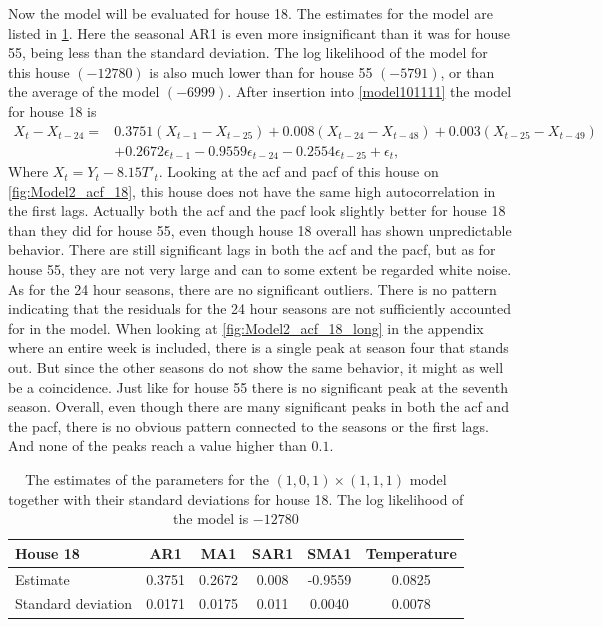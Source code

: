\noindent Now the model will be evaluated for house 18. The estimates for the model are listed in \cref{tab:ParamSig_House18}. Here the seasonal AR1 is even more insignificant than it was for house 55, being less than the standard deviation. The log likelihood of the model for this house $(-12780)$ is also much lower than for house 55 $(-5791)$, or than the average of the model $(-6999)$. After insertion into \cref{model101111} the model for house 18 is
\begin{align}
    X_t-X_{t-24} = &0.3751 (X_{t-1}-X_{t-25}) + 0.008 (X_{t-24}-X_{t-48}) + 0.003 (X_{t-25}-X_{t-49}) \nonumber\\  &+ 0.2672 \epsilon_{t-1} - 0.9559 \epsilon_{t-24} - 0.2554 \epsilon_{t-25} + \epsilon_t,
\end{align}
Where $X_t = Y_t - 8.15 T'_t$. Looking at the acf and pacf of this house on \cref{fig:Model2_acf_18}, this house does not have the same high autocorrelation in the first lags. Actually both the acf and the pacf look slightly better for house 18 than they did for house 55, even though house 18 overall has shown unpredictable behavior. There are still significant lags in both the acf and the pacf, but as for house 55, they are not very large and can to some extent be regarded white noise. As for the 24 hour seasons, there are no significant outliers. There is no pattern indicating that the residuals for the 24 hour seasons are not sufficiently accounted for in the model. When looking at \cref{fig:Model2_acf_18_long} in the appendix where an entire week is included, there is a single peak at season four that stands out. But since the other seasons do not show the same behavior, it might as well be a coincidence. Just like for house 55 there is no significant peak at the seventh season. Overall, even though there are many significant peaks in both the acf and the pacf, there is no obvious pattern connected to the seasons or the first lags. And none of the peaks reach a value higher than $0.1$.

 \begin{table}[]
    \centering
    \begin{tabular}{l|ccccc}
    \hline
    \textbf{House 18} & \textbf{AR1} & \textbf{MA1} & \textbf{SAR1} & \textbf{SMA1} & \textbf{Temperature} \\ \hline \hline
    Estimate           & 0.3751 & 0.2672 & 0.008 & -0.9559 & 0.0825      \\
    Standard deviation & 0.0171 & 0.0175 & 0.011 & 0.0040  & 0.0078      \\ \hline
    \end{tabular}
    \caption{The estimates of the parameters for the $(1,0,1)\times (1,1,1)$ model together with their standard deviations for house 18. The log likelihood of the model is $-12780$}
    \label{tab:ParamSig_House18}
    \end{table}


